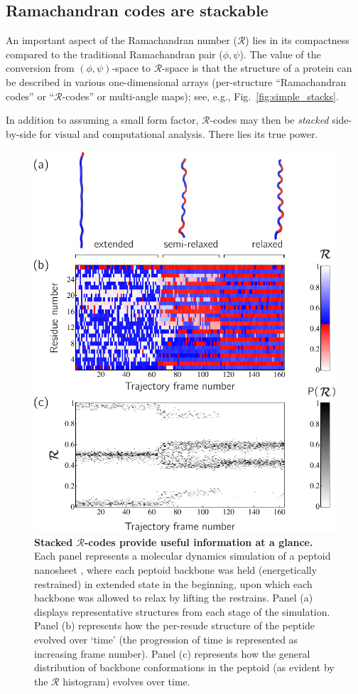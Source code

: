 \documentclass[fleqn,10pt,lineno]{wlpeerj} %
\newcommand{\Fig}[1]{Fig.~\ref{#1}}
\newcommand{\n}[1]{{\color{red}#1}}
\newcommand{\rr}{$\mathcal{R}$\xspace}
\begin{document}

\subsection*{Ramachandran codes are stackable}

\n{An important aspect of the Ramachandran number ($\mathcal{R}$) lies in its compactness compared to the traditional Ramachandran pair ($\phi,\psi$). The value of the conversion from $(\phi,\psi)$-space to \rr-space is that the structure of a protein can be described in various one-dimensional arrays (per-structure ``Ramachandran codes'' or ``$\mathcal{R}$-codes'' or multi-angle maps); see, e.g., \Fig{fig:simple_stacks}.} 

In addition to assuming a small form factor, $\mathcal{R}$-codes may then be \textit{stacked} side-by-side for visual and computational analysis. There lies its true power.


\begin{figure}[t!]
\centering
\includegraphics[width=0.65\linewidth]{figures/nano_r_demo.pdf}
\caption{\textbf{Stacked $\mathcal{R}$-codes provide useful information at a glance.} \n{Each panel represents a molecular dynamics simulation of a peptoid nanosheet \citep{Mannige2016}, where  each peptoid backbone was held (energetically restrained) in extended state in the beginning, upon which each backbone was allowed to relax by lifting the restrains. Panel (a) displays representative structures from each stage of the simulation. Panel (b) represents how the per-resude structure of the peptide evolved over `time' (the progression of time is represented as increasing frame number). Panel (c) represents how the general distribution of backbone conformations in the peptoid (as evident by the \rr histogram) evolves over time.}\label{fig:complex_stacks}} 
\end{figure}
\end{document}
